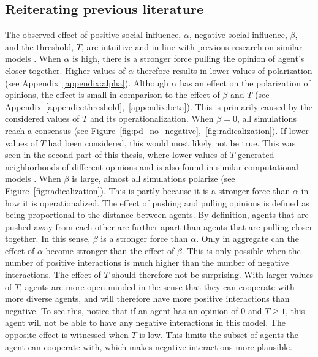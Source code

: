 \documentclass[11pt]{article}
\begin{document}
\subsection{Reiterating previous literature}
The observed effect of positive social influence, $\alpha$, negative social influence, $\beta$, and the threshold, $T$, are intuitive and in line with previous research on similar models \cite{flache_models_2017}.  When $\alpha$ is high, there is a stronger force pulling the opinion of agent's closer together. Higher values of $\alpha$ therefore results in lower values of polarization (see Appendix~\ref{appendix:alpha}). 
Although $\alpha$ has an effect on the polarization of opinions, the effect is small in comparison to the effect of $\beta$ and $T$ (see Appendix~\ref{appendix:threshold},~\ref{appendix:beta}).
This is primarily caused by the considered values of $T$ and its operationalization. When $\beta = 0$, all simulations reach a consensus (see Figure~\ref{fig:pd_no_negative},~\ref{fig:radicalization}). If lower values of $T$ had been considered, this would most likely not be true. This was seen in the second part of this thesis, where lower values of $T$ generated neighborhoods of different opinions and is also found in similar computational models \cite{flache_models_2017,sasahara_social_2021}. When $\beta$ is large, almost all simulations polarize (see Figure~\ref{fig:radicalization}). This is partly because it is a stronger force than $\alpha$ in how it is operationalized.  The effect of pushing and pulling opinions is defined as being proportional to the distance between agents. 
By definition, agents that are pushed away from each other are further apart than agents that are pulling closer together. In this sense, $\beta$ is a stronger force than $\alpha$. Only in aggregate can the effect of $\alpha$ become stronger than the effect of $\beta$. This is only possible when the number of positive interactions is much higher than the number of negative interactions. The effect of $T$ should therefore not be surprising. With larger values of $T$, agents are more open-minded in the sense that they can cooperate with more diverse agents, and will therefore have more positive interactions than negative. To see this, notice that if an agent has an opinion of 0 and $T\geq1$, this agent will not be able to have any negative interactions in this model. The opposite effect is witnessed when $T$ is low. This limits the subset of agents the agent can cooperate with, which makes negative interactions more plausible.
\end{document}
